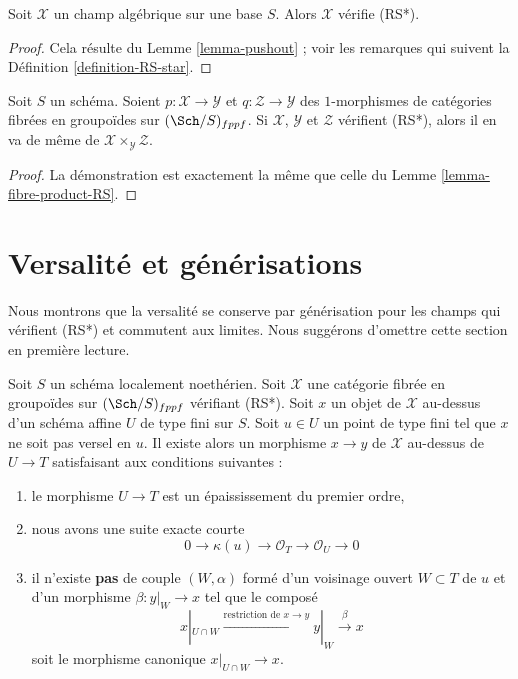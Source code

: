 \begin{lemma}
\label{lemma-algebraic-stack-RS-star}
Soit $\mathcal{X}$ un champ algébrique sur une base $S$.
Alors $\mathcal{X}$ vérifie (RS*).
\end{lemma}

\begin{proof}
Cela résulte du Lemme \ref{lemma-pushout} ; voir les
remarques qui suivent la Définition \ref{definition-RS-star}.
\end{proof}

\begin{lemma}
\label{lemma-fibre-product-RS-star}
Soit $S$ un schéma. Soient $p : \mathcal{X} \to \mathcal{Y}$ et
$q : \mathcal{Z} \to \mathcal{Y}$ des $1$-morphismes de catégories
fibrées en groupoïdes sur $(\Sch/S)_{fppf}$. Si $\mathcal{X}$, $\mathcal{Y}$
et $\mathcal{Z}$ vérifient (RS*), alors il en va de même de
$\mathcal{X} \times_\mathcal{Y} \mathcal{Z}$.
\end{lemma}

\begin{proof}
La démonstration est exactement la même que celle du
Lemme \ref{lemma-fibre-product-RS}.
\end{proof}








\section{Versalité et générisations}
\label{section-generalize-versality}

\noindent
Nous montrons que la versalité se conserve par générisation
pour les champs qui vérifient (RS*) et commutent aux limites.
Nous suggérons d'omettre cette section en première lecture.

\begin{lemma}
\label{lemma-single-point}
Soit $S$ un schéma localement noethérien. Soit $\mathcal{X}$ une catégorie
fibrée en groupoïdes sur $(\Sch/S)_{fppf}$ vérifiant (RS*).
Soit $x$ un objet de $\mathcal{X}$ au-dessus d'un schéma affine $U$
de type fini sur $S$. Soit $u \in U$ un point de type fini tel que
$x$ ne soit pas versel en $u$. Il existe alors un morphisme $x \to y$
de $\mathcal{X}$ au-dessus de $U \to T$ satisfaisant aux conditions suivantes :
\begin{enumerate}
\item le morphisme $U \to T$ est un épaississement du premier ordre,
\item nous avons une suite exacte courte
$$
0 \to \kappa(u) \to \mathcal{O}_T \to \mathcal{O}_U \to 0
$$
\item il n'existe {\bf pas} de couple $(W, \alpha)$
formé d'un voisinage ouvert $W \subset T$ de $u$
et d'un morphisme $\beta : y|_W \to x$ tel que le composé
$$
x|_{U \cap W} \xrightarrow{\text{restriction de }x \to y}
y|_W \xrightarrow{\beta} x
$$
soit le morphisme canonique $x|_{U \cap W} \to x$.
\end{enumerate}
\end{lemma}

